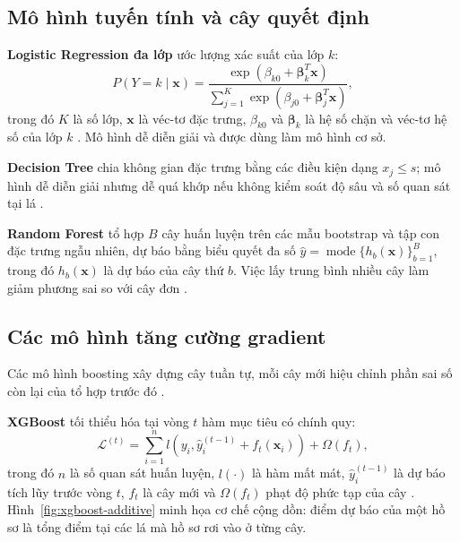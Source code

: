 \subsection{Mô hình tuyến tính và cây quyết định}

\noindent\textbf{Logistic Regression đa lớp} ước lượng xác suất của lớp $k$:
\[
P(Y=k\mid\mathbf{x})
=
\frac{\exp(\beta_{k0}+\boldsymbol{\beta}_{k}^{T}\mathbf{x})}
{\sum_{j=1}^{K}\exp(\beta_{j0}+\boldsymbol{\beta}_{j}^{T}\mathbf{x})},
\]
trong đó $K$ là số lớp, $\mathbf{x}$ là véc-tơ đặc trưng, $\beta_{k0}$ và $\boldsymbol{\beta}_{k}$ là hệ số chặn và véc-tơ hệ số của lớp $k$ \cite{hosmer2013applied}. Mô hình dễ diễn giải và được dùng làm mô hình cơ sở.

\medskip
\noindent\textbf{Decision Tree} chia không gian đặc trưng bằng các điều kiện dạng $x_j\le s$; mô hình dễ diễn giải nhưng dễ quá khớp nếu không kiểm soát độ sâu và số quan sát tại lá \cite{quinlan1986induction}.

\medskip
\noindent\textbf{Random Forest} tổ hợp $B$ cây huấn luyện trên các mẫu bootstrap và tập con đặc trưng ngẫu nhiên, dự báo bằng biểu quyết đa số $\hat{y}=\operatorname{mode}\{h_b(\mathbf{x})\}_{b=1}^{B}$, trong đó $h_b(\mathbf{x})$ là dự báo của cây thứ $b$. Việc lấy trung bình nhiều cây làm giảm phương sai so với cây đơn \cite{breiman2001random}.

\subsection{Các mô hình tăng cường gradient}

Các mô hình boosting xây dựng cây tuần tự, mỗi cây mới hiệu chỉnh phần sai số còn lại của tổ hợp trước đó \cite{friedman2001greedy}.

\medskip
\noindent\textbf{XGBoost} tối thiểu hóa tại vòng $t$ hàm mục tiêu có chính quy:
\[
\mathcal{L}^{(t)}
=
\sum_{i=1}^{n}
l(y_i,\hat{y}_{i}^{(t-1)}+f_t(\mathbf{x}_i))
+\Omega(f_t),
\]
trong đó $n$ là số quan sát huấn luyện, $l(\cdot)$ là hàm mất mát, $\hat{y}_{i}^{(t-1)}$ là dự báo tích lũy trước vòng $t$, $f_t$ là cây mới và $\Omega(f_t)$ phạt độ phức tạp của cây \cite{chen2016xgboost}. Hình~\ref{fig:xgboost-additive} minh họa cơ chế cộng dồn: điểm dự báo của một hồ sơ là tổng điểm tại các lá mà hồ sơ rơi vào ở từng cây.

